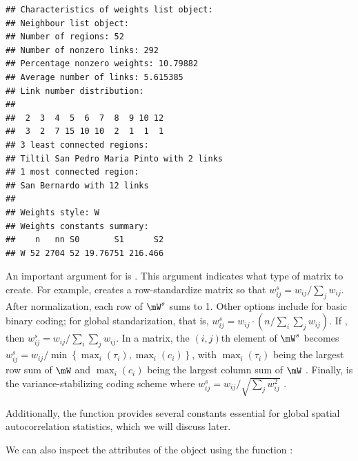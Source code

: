 \begin{knitrout}
\color{fgcolor}\begin{kframe}
\begin{alltt}
 \hlkwb{<-}   \hldef{=} \hldef{)}
\end{alltt}
\begin{verbatim}
## Characteristics of weights list object:
## Neighbour list object:
## Number of regions: 52 
## Number of nonzero links: 292 
## Percentage nonzero weights: 10.79882 
## Average number of links: 5.615385 
## Link number distribution:
## 
##  2  3  4  5  6  7  8  9 10 12 
##  3  2  7 15 10 10  2  1  1  1 
## 3 least connected regions:
## Tiltil San Pedro Maria Pinto with 2 links
## 1 most connected region:
## San Bernardo with 12 links
## 
## Weights style: W 
## Weights constants summary:
##    n   nn S0       S1      S2
## W 52 2704 52 19.76751 216.466
\end{verbatim}
\end{kframe}
\end{knitrout}

An important argument for  is . This argument indicates what type of matrix to create. For example,  creates a row-standardize matrix so that $w^s_{ij} = w_{ij}/ \sum_j w_{ij}$. After normalization, each row of $\mW^s$ sums to 1. Other options include  for basic binary coding;  for global standarization, that is, $w^s_{ij} = w_{ij} \cdot (n/ \sum_{i}\sum_j w_{ij})$. If , then $w^s_{ij} = w_{ij}/ \sum_i\sum_j w_{ij}$. In a  matrix, the $(i,j)$th element of $\mW^s$  becomes $w^s_{ij} = w_{ij} / \min\left\lbrace \max_i(\tau_i), \max_i(c_i)\right\rbrace$, with $\max_i(\tau_i)$ being the largest row sum of $\mW$ and $\max_i(c_i)$ being the largest column sum of $\mW$ \citep{kelejian2010specification}. Finally,  is the variance-stabilizing coding scheme where $w^s_{ij} = w_{ij}/ \sqrt{\sum_j w_{ij} ^2}$ \citep{tiefelsdorf1999variance}. 

Additionally, the  function provides several constants essential for global spatial autocorrelation statistics, which we will discuss later. 

We can also inspect the attributes of the object using the function :

